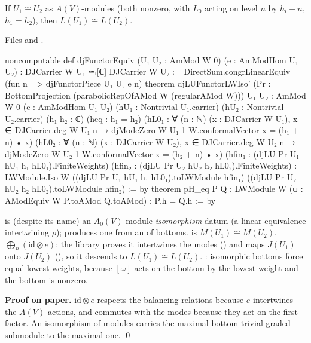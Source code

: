 \begin{theorem}\label{l13:thm:functorial}
If $U_1\cong U_2$ as $A(V)$-modules (both nonzero, with $L_0$ acting on level $n$ by $h_i+n$, $h_1 = h_2$), then
$L(U_1)\cong L(U_2)$.
\end{theorem}
\noindent Files  and
.
\begin{leancode}
noncomputable def djFunctorEquiv (U₁ U₂ : AmMod W 0) (e : AmModHom U₁ U₂) :
    DJCarrier W U₁ ≃ₗ[ℂ] DJCarrier W U₂ :=
  DirectSum.congrLinearEquiv (fun n => djFunctorPiece U₁ U₂ e n)
theorem djLUFunctorLWIso' (Pr : BottomProjection (parabolicRepOfAMod W (regularAMod W)))
    {U₁ U₂ : AmMod W 0} (e : AmModHom U₁ U₂) (hU₁ : Nontrivial U₁.carrier)
    (hU₂ : Nontrivial U₂.carrier) (h₁ h₂ : ℂ) (heq : h₁ = h₂)
    (hL0₁ : ∀ (n : ℕ) (x : DJCarrier W U₁), x ∈ DJCarrier.deg W U₁ n →
      djModeZero W U₁ 1 W.conformalVector x = (h₁ + n) • x)
    (hL0₂ : ∀ (n : ℕ) (x : DJCarrier W U₂), x ∈ DJCarrier.deg W U₂ n →
      djModeZero W U₂ 1 W.conformalVector x = (h₂ + n) • x)
    (hfin₁ : (djLU Pr U₁ hU₁ h₁ hL0₁).FiniteWeights)
    (hfin₂ : (djLU Pr U₂ hU₂ h₂ hL0₂).FiniteWeights) :
    LWModule.Iso W ((djLU Pr U₁ hU₁ h₁ hL0₁).toLWModule hfin₁)
      ((djLU Pr U₂ hU₂ h₂ hL0₂).toLWModule hfin₂) := by
theorem pH_eq {P Q : LWModule W} (ψ : AModEquiv W P.toAMod Q.toAMod) : P.h = Q.h := by
\end{leancode}

\begin{dictionary}
 is (despite its name) an $A_0(V)$-module \emph{isomorphism} datum (a linear equivalence intertwining $\rho$);
 produces one from an  of bottoms.  is $M(U_1)\cong M(U_2)$,
$\bigoplus_n(\mathrm{id}\otimes e)$; the library proves it intertwines the modes () and maps $J(U_1)$
onto $J(U_2)$ (), so it descends to $L(U_1)\cong L(U_2)$. : isomorphic bottoms force equal
lowest weights, because $[\omega]$ acts on the bottom by the lowest weight and the bottom is nonzero.
\end{dictionary}

\textbf{Proof on paper.} $\mathrm{id}\otimes e$ respects the balancing relations because $e$ intertwines the $A(V)$-actions, and commutes
with the modes because they act on the first factor. An isomorphism of modules carries the maximal bottom-trivial graded submodule to
the maximal one. \qed

